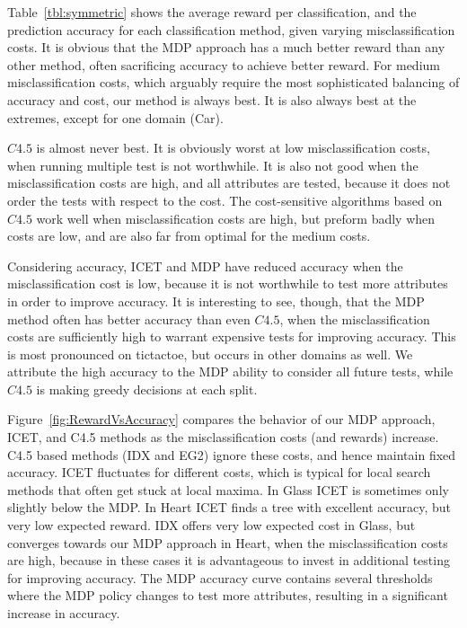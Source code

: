\documentclass[letterpaper]{article}
\theoremstyle{definition}
\begin{document}
Table~\ref{tbl:symmetric} shows the average reward per classification, and the prediction accuracy for each classification method, given varying misclassification costs. It is obvious that the MDP approach has a much better reward than any other method, often sacrificing accuracy to achieve better reward. For medium misclassification costs, which arguably require the most sophisticated balancing of accuracy and cost, our method is always best. It is also always best at the extremes, except for one domain (Car).

$C4.5$ is almost never best. It is obviously worst at low misclassification costs, when running multiple test is not worthwhile. It is also not good when the misclassification costs are high, and all attributes are tested, because it does not order the tests with respect to the cost. 
The cost-sensitive algorithms based on $C4.5$ work well when misclassification costs are high, but preform badly when costs are low, and are also far from optimal for the medium costs.

Considering accuracy, ICET and MDP have reduced accuracy when the misclassification cost is low, because it is not worthwhile to test more attributes in order to improve accuracy. It is interesting to see, though, that the MDP method often has better accuracy than even $C4.5$, when the misclassification costs are sufficiently high to warrant expensive tests for improving accuracy. This is most pronounced on tictactoe, but occurs in other domains as well. We attribute the high accuracy to the MDP ability to consider all future tests, while $C4.5$ is making greedy decisions at each split.

Figure~\ref{fig:RewardVsAccuracy} compares the behavior of our MDP approach, ICET, and C4.5 methods as the misclassification costs (and rewards) increase. C4.5 based methods (IDX and EG2) ignore these costs, and hence maintain fixed accuracy. ICET fluctuates for different costs, which is typical for local search methods that often get stuck at local maxima. In Glass ICET is sometimes only slightly below the MDP. In Heart ICET finds a tree with excellent accuracy, but very low expected reward. IDX offers very low expected cost in Glass, but converges towards our MDP approach in Heart, when the misclassification costs are high, because in these cases it is advantageous to invest in additional testing for improving accuracy. The MDP accuracy curve contains several thresholds where the MDP policy changes to test more attributes, resulting in a significant increase in accuracy. 
\end{document}
